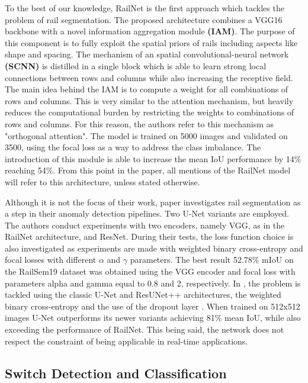 \documentclass[conference]{IEEEtran}
\begin{document}
To the best of our knowledge, RailNet \cite{li2020railnet} is the first approach which tackles the problem of rail segmentation. The proposed architecture combines a VGG16 backbone with a novel information aggregation module \textbf{(IAM)}. The purpose of this component is to fully exploit the spatial priors of rails including aspects like shape and spacing. The mechanism of an spatial convolutional-neural network \textbf{(SCNN)} is distilled in a single block which is able to learn strong local connections between rows and columns while also increasing the receptive field. The main idea behind the IAM is to compute a weight for all combinations of rows and columns. This is very similar to the attention mechanism, but heavily reduces the computational burden by restricting the weights to combinations of rows and columns. For this reason, the authors refer to this mechanism as "orthogonal attention". The model is trained on 5000 images and validated on 3500, using the focal loss \cite{lin2017focal} as a way to address the class imbalance. The introduction of this module is able to increase the mean IoU performance by 14\% reaching 54\%. From this point in the paper, all mentions of the RailNet model will refer to this architecture, unless stated otherwise.

Although it is not the focus of their work, paper \cite{jahan2021anomaly} investigates rail segmentation as a step in their anomaly detection pipelines. Two U-Net variants are employed. The authors conduct experiments with two encoders, namely VGG, as in the RailNet architecture, and ResNet. During their tests, the loss function choice is also investigated as experiments are made with weighted binary cross-entropy and focal losses with different 
$\alpha$ and $\gamma$
parameters. The best result 52.78\% mIoU on the RailSem19 dataset was obtained using the VGG encoder and focal loss with parameters alpha and gamma equal to 0.8 and 2, respectively. In \cite{alexandrescu2022dynamic}, the problem is tackled using the classic U-Net and ResUNet++ \cite{jha2019resunet_plus_plus} architectures, the weighted binary cross-entropy and the use of the dropout layer \cite{srivastava2014dropout}. When trained on 512x512 images U-Net outperforms its newer variants achieving 81\% mean IoU, while also exceeding the performance of RailNet. This being said, the network does not respect the constraint of being applicable in real-time applications. 

\subsection{Switch Detection and Classification}
\end{document}
